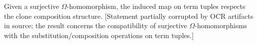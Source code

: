 Given a surjective $\Omega$-homomorphism, the induced map on term tuples respects the clone composition structure. [Statement partially corrupted by OCR artifacts in source; the result concerns the compatibility of surjective $\Omega$-homomorphisms with the substitution/composition operations on term tuples.]
